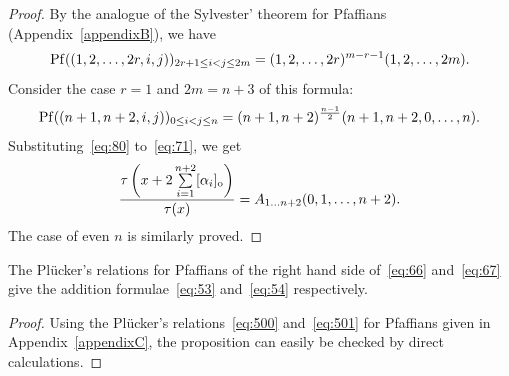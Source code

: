 \begin{proof}
By the analogue of the Sylvester' theorem for Pfaf\/f\/ians (Appendix~\ref{appendixB}), we have
\begin{gather*}%
{\rm Pf}((1,2,\dots,2r,i,j))_{2r+1\le i<j\le2m}=(1,2,\dots,2r)^{m-r-1}(1,2,\dots,2m).
\end{gather*}
Consider the case $r=1$ and $2m=n+3$ of this formula:
\begin{gather}
{\rm Pf}((n+1,n+2,i,j))_{0\le i<j\le n}=(n+1,n+2)^{\frac{n-1}{2}}(n+1,n+2,0,\dots,n).
\label{eq:80}
\end{gather}
Substituting~\eqref{eq:80} to~\eqref{eq:71}, we get
\begin{gather*}%
\frac{\tau\left(x+2\sum\limits_{i=1}^{n+2}[\alpha_i]_{\rm o}\right)}{\tau(x)}=A_{1\dots n+2}(0,1,\dots,n+2).
\end{gather*}
The case of even $n$ is similarly proved.
\end{proof}

\begin{proposition}\label{proposition9}
The Pl\"{u}cker's relations for Pfaffians of the right hand side of~\eqref{eq:66} and~\eqref{eq:67}
give the addition formulae~\eqref{eq:53} and~\eqref{eq:54} respectively.
\end{proposition}

\begin{proof}
Using the Pl\"{u}cker's relations~\eqref{eq:500} and~\eqref{eq:501} for Pfaf\/f\/ians given in Appendix~\ref{appendixC},
the proposition can easily be checked by direct calculations.
\end{proof}
